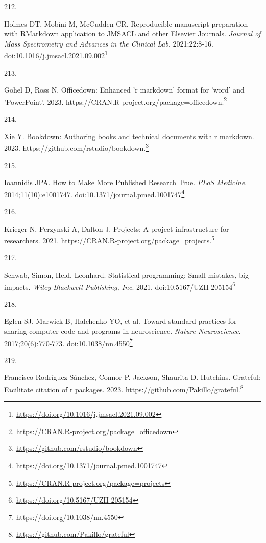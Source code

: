 \documentclass[
  a4paper,
]{book}
\newlength{\cslhangindent}
\newlength{\csllabelwidth}
\newlength{\cslentryspacingunit} %
\newenvironment{CSLReferences}[2] %
 {%
  \setlength{\parindent}{0pt}
  \ifodd #1
  \let\oldpar\par
  \def\par{\hangindent=\cslhangindent\oldpar}
  \fi
  \setlength{\parskip}{#2\cslentryspacingunit}
 }%
 {}
\newcommand{\CSLLeftMargin}[1]{\parbox[t]{\csllabelwidth}{#1}}
\newcommand{\CSLRightInline}[1]{\parbox[t]{\linewidth - \csllabelwidth}{#1}\break}
\renewcommand{\href}[2]{#2\footnote{\url{#1}}}
\begin{document}
\begin{CSLReferences}{0}{0}
\leavevmode{}%
\CSLLeftMargin{212. }%
\CSLRightInline{Holmes DT, Mobini M, McCudden CR. Reproducible manuscript preparation with RMarkdown application to JMSACL and other Elsevier Journals. \emph{Journal of Mass Spectrometry and Advances in the Clinical Lab}. 2021;22:8-16. doi:\href{https://doi.org/10.1016/j.jmsacl.2021.09.002}{10.1016/j.jmsacl.2021.09.002}}

\leavevmode{}%
\CSLLeftMargin{213. }%
\CSLRightInline{Gohel D, Ross N. Officedown: Enhanced 'r markdown' format for 'word' and 'PowerPoint'. 2023. \href{https://CRAN.R-project.org/package=officedown}{https://CRAN.R-project.org/package=officedown.}}

\leavevmode{}%
\CSLLeftMargin{214. }%
\CSLRightInline{Xie Y. Bookdown: Authoring books and technical documents with r markdown. 2023. \href{https://github.com/rstudio/bookdown}{https://github.com/rstudio/bookdown.}}

\leavevmode{}%
\CSLLeftMargin{215. }%
\CSLRightInline{Ioannidis JPA. How to Make More Published Research True. \emph{PLoS Medicine}. 2014;11(10):e1001747. doi:\href{https://doi.org/10.1371/journal.pmed.1001747}{10.1371/journal.pmed.1001747}}

\leavevmode{}%
\CSLLeftMargin{216. }%
\CSLRightInline{Krieger N, Perzynski A, Dalton J. Projects: A project infrastructure for researchers. 2021. \href{https://CRAN.R-project.org/package=projects}{https://CRAN.R-project.org/package=projects.}}

\leavevmode{}%
\CSLLeftMargin{217. }%
\CSLRightInline{Schwab, Simon, Held, Leonhard. Statistical programming: Small mistakes, big impacts. \emph{Wiley-Blackwell Publishing, Inc}. 2021. doi:\href{https://doi.org/10.5167/UZH-205154}{10.5167/UZH-205154}}

\leavevmode{}%
\CSLLeftMargin{218. }%
\CSLRightInline{Eglen SJ, Marwick B, Halchenko YO, et al. Toward standard practices for sharing computer code and programs in neuroscience. \emph{Nature Neuroscience}. 2017;20(6):770-773. doi:\href{https://doi.org/10.1038/nn.4550}{10.1038/nn.4550}}

\leavevmode{}%
\CSLLeftMargin{219. }%
\CSLRightInline{Francisco Rodríguez-Sánchez, Connor P. Jackson, Shaurita D. Hutchins. Grateful: Facilitate citation of r packages. 2023. \href{https://github.com/Pakillo/grateful}{https://github.com/Pakillo/grateful.}}


\end{CSLReferences}
\end{document}
